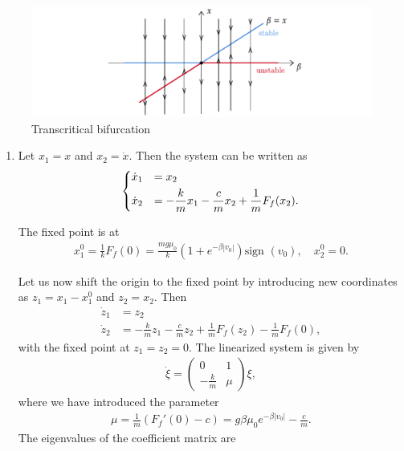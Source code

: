 \begin{solution}[4.3]
\begin{enumerate}
\begin{figure}[h]
	\centering
	\includegraphics[scale=0.9]{figures/solutions/ch4/S05D01.pdf}
	\caption{Transcritical bifurcation}
\end{figure}
\end{enumerate}
\end{solution}

\begin{solution}[4.4]
\begin{enumerate}
	\item Let $x_1=x$ and $x_2=\dot{x}$. Then the system can be written as
\begin{align}
	\begin{dcases}
\dot{x}_1&=x_2\\
\dot{x}_2&=-\frac{k}{m}x_1 -\frac{c}{m}x_2 +\frac{1}{m}F_f(x_2).
	\end{dcases}
\end{align}

The fixed point is at 
\begin{align}
x^{0}_1=\frac{1}{k}F_f(0)=\frac{mg\mu_0}{k}\left(1+e^{-\beta|v_0|} \right)\text{sign }(v_0), \quad x^{0}_2=0.
\end{align}

Let us now shift the origin to the fixed point by introducing new coordinates as $z_1 = x_1 - x^0_1$ and $z_2=x_2$. 
Then 
\begin{align}
\label{eq111}
\dot{z}_1&=z_2\\
\dot{z}_2&=-\frac{k}{m}z_1 -\frac{c}{m}z_2 +\frac{1}{m}F_f(z_2)-\frac{1}{m}F_f(0),
\end{align}
with the fixed point at $z_1=z_2=0$. The linearized system is given by
\begin{align}
\dot{\xi}=\begin{pmatrix} 0 & 1 \\ -\frac{k}{m} & \mu \end{pmatrix}\xi, 
\end{align}
where we have introduced the parameter
\begin{align}
\boxed{\mu=\frac{1}{m}\left(F_f'(0)-c\right) = g\beta \mu_0 e^{-\beta|v_0|}-\frac{c}{m}}. 
\end{align}
The eigenvalues of the coefficient matrix are 


\end{enumerate}
\end{solution}
